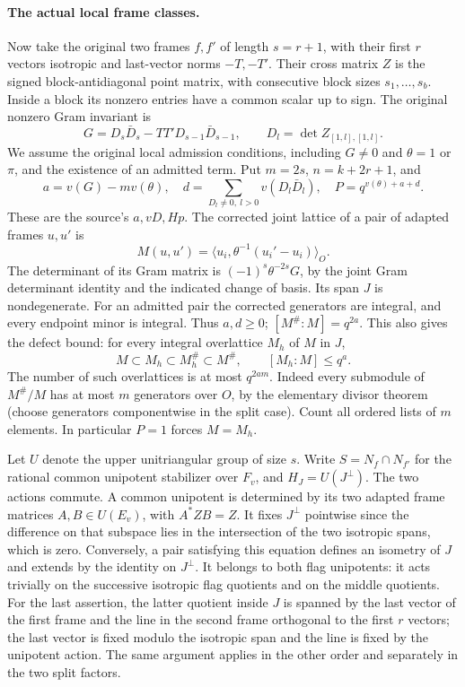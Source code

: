 \paragraph{The actual local frame classes.}
Now take the original two frames \(f,f'\) of length \(s=r+1\),
with their first \(r\) vectors isotropic and last-vector norms
\(-T,-T'\). Their cross matrix \(Z\) is the signed block-antidiagonal
point matrix, with consecutive block sizes \(s_1,\ldots,s_b\).
Inside a block its nonzero entries have a common scalar up to
sign. The original nonzero Gram invariant is
\[
 G=D_s\bar D_s-TT'D_{s-1}\bar D_{s-1},
 \qquad D_l=\det Z_{[1,l],[1,l]}.
\]
We assume the original local admission conditions, including
\(G\ne0\) and \(\theta=1\) or \(\pi\), and the existence of an
admitted term. Put \(m=2s\), \(n=k+2r+1\), and
\[
 a=v(G)-m v(\theta),\quad
 d=\sum_{D_l\ne0,\ l>0}v(D_l\bar D_l),\quad
 P=q^{v(\theta)+a+d}.
 \tag{GL2}
\]
These are the source's \(a,vD,Hp\). The corrected joint lattice
of a pair of adapted frames \(u,u'\) is
\[
 M(u,u')=\langle u_i,\theta^{-1}(u_i'-u_i)\rangle_O .
\]
The determinant of its Gram matrix is
\((-1)^s\theta^{-2s}G\), by the joint Gram determinant identity
and the indicated change of basis. Its span \(J\) is nondegenerate.
For an admitted pair the corrected generators are integral,
and every endpoint minor is integral. Thus \(a,d\ge0\);
\([M^\#:M]=q^{2a}\). This also gives the defect bound:
for every integral overlattice \(M_h\) of \(M\) in \(J\),
\[
 M\subset M_h\subset M_h^\#\subset M^\#,\qquad
 [M_h:M]\le q^a.
 \tag{GL3}
\]
The number of such overlattices is at most \(q^{2am}\).
Indeed every submodule of \(M^\#/M\) has at most \(m\) generators
over \(O\), by the elementary divisor theorem (choose generators
componentwise in the split case). Count all ordered lists of
\(m\) elements. In particular \(P=1\) forces \(M=M_h\).

Let \(U\) denote the upper unitriangular group of size \(s\).
Write \(S=N_f\cap N_{f'}\) for the rational common unipotent
stabilizer over \(F_v\), and \(H_J=U(J^\perp)\).
The two actions commute. A common unipotent is determined by
its two adapted frame matrices \(A,B\in U(E_v)\), with
\(A^*ZB=Z\). It fixes \(J^\perp\) pointwise since the difference
on that subspace lies in the intersection of the two isotropic
spans, which is zero. Conversely, a pair satisfying this equation
defines an isometry of \(J\) and extends by the identity on
\(J^\perp\). It belongs to both flag unipotents: it acts trivially
on the successive isotropic flag quotients and on the middle
quotients. For the last assertion, the latter quotient inside
\(J\) is spanned by the last vector of the first frame and
the line in the second frame orthogonal to the first \(r\)
vectors; the last vector is fixed modulo the isotropic span
and the line is fixed by the unipotent action. The same
argument applies in the other order and separately in the
two split factors.

